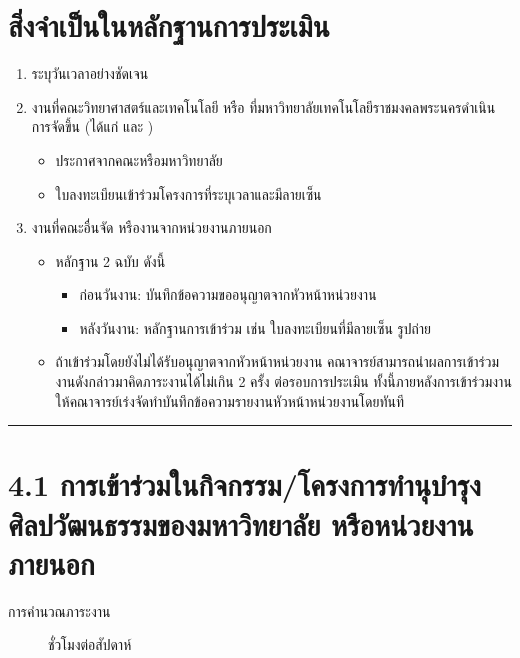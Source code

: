 \documentclass[a4paper,12pt,english]{sphinxmanual}
\begin{document}
\section{สิ่งจำเป็นในหลักฐานการประเมิน}
\label{\detokenize{4culture:id3}}\begin{enumerate}
%
\item {} 
 ระบุวันเวลาอย่างชัดเจน

\item {} 
งานที่คณะวิทยาศาสตร์และเทคโนโลยี หรือ ที่มหาวิทยาลัยเทคโนโลยีราชมงคลพระนครดำเนินการจัดขึ้น (ได้แก่ {\hyperref[\detokenize{4culture:id4}]{}} และ {\hyperref[\detokenize{4culture:id13}]{}})
\begin{itemize}
\item {} 
ประกาศจากคณะหรือมหาวิทยาลัย

\item {} 
ใบลงทะเบียนเข้าร่วมโครงการที่ระบุเวลาและมีลายเซ็น

\end{itemize}

\item {} 
งานที่คณะอื่นจัด หรืองานจากหน่วยงานภายนอก
\begin{itemize}
\item {} 
หลักฐาน 2 ฉบับ ดังนี้
\begin{itemize}
\item {} 
ก่อนวันงาน: บันทึกข้อความขออนุญาตจากหัวหน้าหน่วยงาน

\item {} 
หลังวันงาน: หลักฐานการเข้าร่วม เช่น ใบลงทะเบียนที่มีลายเซ็น รูปถ่าย

\end{itemize}

\item {} 
ถ้าเข้าร่วมโดยยังไม่ได้รับอนุญาตจากหัวหน้าหน่วยงาน คณาจารย์สามารถนำผลการเข้าร่วมงานดังกล่าวมาคิดภาระงานได้ไม่เกิน 2 ครั้ง ต่อรอบการประเมิน ทั้งนี้ภายหลังการเข้าร่วมงานให้คณาจารย์เร่งจัดทำบันทึกข้อความรายงานหัวหน้าหน่วยงานโดยทันที

\end{itemize}

\end{enumerate}


\bigskip\hrule\bigskip



\section{4.1 การเข้าร่วมในกิจกรรม/โครงการทำนุบำรุงศิลปวัฒนธรรมของมหาวิทยาลัย หรือหน่วยงานภายนอก}
\label{\detokenize{4culture:id4}}\label{\detokenize{4culture:id5}}\begin{description}
\item[{การคำนวณภาระงาน}]  ชั่วโมงต่อสัปดาห์

\end{description}
\end{document}
